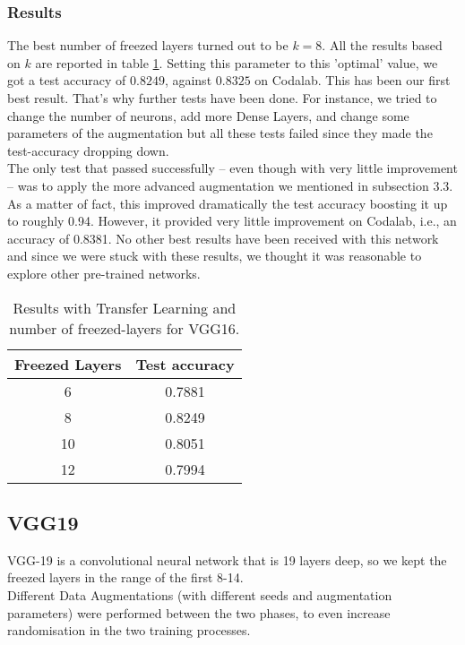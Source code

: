 \documentclass[11pt]{article}
\begin{document}
\subsubsection{Results}
The best number of freezed layers turned out to be $k=8$. All the results based on $k$ are reported in table \ref{vgg16_results}. Setting this parameter to this 'optimal' value, we got a test accuracy of $0.8249$, against $0.8325$ on Codalab. This has been our first best result. That's why further tests have been done. For instance, we tried to change the number of neurons, add more Dense Layers, and change some parameters of the augmentation but all these tests failed since they made the test-accuracy dropping down.\\[0.1cm]
The only test that passed successfully -- even though with very little improvement -- was to apply the more advanced augmentation we mentioned in subsection 3.3. As a matter of fact, this improved dramatically the test accuracy boosting it up to roughly 0.94. However, it provided very little improvement on Codalab, i.e., an accuracy of 0.8381. No other best results have been received with this network and since we were stuck with these results, we thought it was reasonable to explore other pre-trained networks.
\begin{table}[ht]
  \centering
  \begin{adjustbox}{width=150}
  \small
\begin{tabular}{|c|c|}

\hline \bf Freezed Layers & \bf Test accuracy \\ \hline
6 & 0.7881 \\
8 & 0.8249 \\
10 & 0.8051 \\
12 & 0.7994 \\

\hline
\end{tabular}
\end{adjustbox}
\caption{Results with Transfer Learning and number of freezed-layers for VGG16.}
\label{vgg16_results}
\end{table}
\subsection{VGG19}
VGG-19 is a convolutional neural network that is 19 layers deep, so we kept the freezed layers in the range of the first 8-14.\\
Different Data Augmentations (with different seeds and augmentation parameters) were performed between the two phases,
to even increase randomisation in the two training processes.
\end{document}
